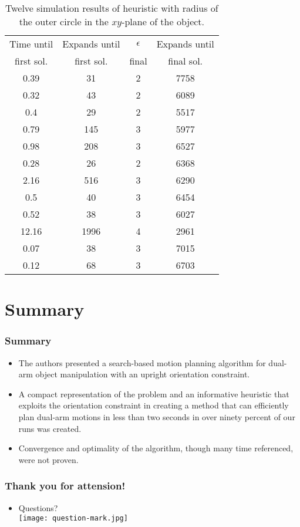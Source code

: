 \documentclass{beamer}
\begin{document}
\begin{frame}
\begin{table}
  \begin{tabular}{| c | c | c | c |}
	\hline
	Time until 	& Expands until &$\epsilon$	& Expands until \\
	first sol.	& first sol. 	&	final	& final sol.	\\ \hline
	0.39 		&31 			&2 			&7758			\\ \hline
	0.32 		&43 			&2 			&6089			\\ \hline
	0.4 		&29 			&2 			&5517			\\ \hline
	0.79 		&145 			&3 			&5977			\\ \hline
	0.98 		&208 			&3 			&6527			\\ \hline
	0.28 		&26 			&2 			&6368			\\ \hline
	2.16		&516 			&3 			&6290			\\ \hline
	0.5 		&40 			&3 			&6454			\\ \hline
	0.52 		&38 			&3 			&6027			\\ \hline
	12.16 		&1996 			&4 			&2961			\\ \hline
	0.07 		&38 			&3 			&7015			\\ \hline
	0.12 		&68 			&3 			&6703			\\ \hline
	
  \end{tabular}
  \caption{Twelve simulation results of heuristic with radius of
the outer circle in the $xy$-plane of the object.}
\end{table}
\end{frame}

\section{Summary}

\begin{frame}
\frametitle<presentation>{Summary}

\begin{itemize}
  \item The authors presented a search-based motion planning algorithm
for dual-arm object manipulation with an upright orientation
constraint. 
\item A compact representation
of the problem and an informative heuristic that exploits
the orientation constraint in creating a method that can
efficiently plan dual-arm motions in less than two seconds 
in over ninety percent of our runs was created.
\end{itemize}


\begin{itemize}
  \item Convergence and optimality of the algorithm, though many time
  referenced, were not proven.
\end{itemize}
\end{frame}

\begin{frame}
\frametitle<presentation>{Thank you for attension!}
\begin{itemize}
  \item Questions? \\
  \texttt{[image: question-mark.jpg]}
\end{itemize}
\end{frame}
\end{document}
